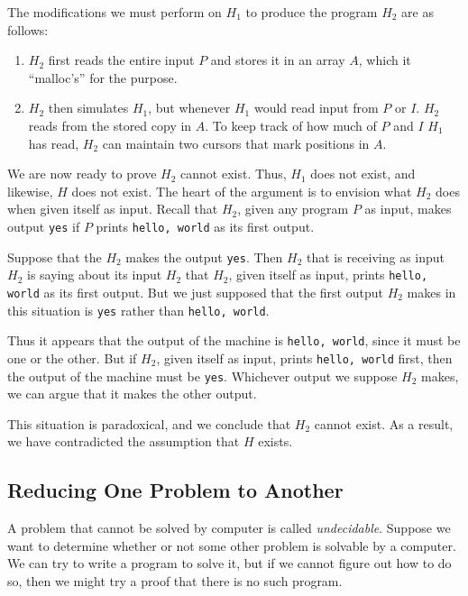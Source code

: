 \documentclass[]{article}
\begin{document}
    The modifications we must perform on $H_1$ to produce the program $H_2$ are
    as follows:
      \begin{enumerate}
        \item $H_2$ first reads the entire input $P$ and stores it in an array
        $A$, which it ``malloc's'' for the purpose.
        \item $H_2$ then simulates $H_1$, but whenever $H_1$ would read input 
        from $P$ or $I$. $H_2$ reads from the stored copy in $A$. To keep track 
        of how much of $P$ and $I$ $H_1$ has read, $H_2$ can maintain two
        cursors that mark positions in $A$.
      \end{enumerate}
      
    We are now ready to prove $H_2$ cannot exist. Thus, $H_1$ does not exist,
    and likewise, $H$ does not exist. The heart of the argument is to envision
    what $H_2$ does when given itself as input. Recall that $H_2$, given any
    program $P$ as input, makes output \texttt{yes} if $P$ prints 
    \texttt{hello, world} as its first output.
    
    Suppose that the $H_2$ makes the output \texttt{yes}. Then $H_2$ that is 
    receiving as input $H_2$ is saying about its input $H_2$ that $H_2$, given
    itself as input, prints \texttt{hello, world} as its first output. But we 
    just supposed that the first output $H_2$ makes in this situation is 
    \texttt{yes} rather than \texttt{hello, world}.
    
    Thus it appears that the output of the machine is \texttt{hello, world},
    since it must be one or the other. But if $H_2$, given itself as input,
    prints \texttt{hello, world} first, then the output of the machine must be
    \texttt{yes}. Whichever output we suppose $H_2$ makes, we can argue that it
    makes the other output.
    
    This situation is paradoxical, and we conclude that $H_2$ cannot exist. As 
    a result, we have contradicted the assumption that $H$ exists.
    
  \subsection*{Reducing One Problem to Another}
    A problem that cannot be solved by computer is called \emph{undecidable}.
    Suppose we want to determine whether or not some other problem is solvable
    by a computer. We can try to write a program to solve it, but if we cannot
    figure out how to do so, then we might try a proof that there is no such
    program.
    
\end{document}
